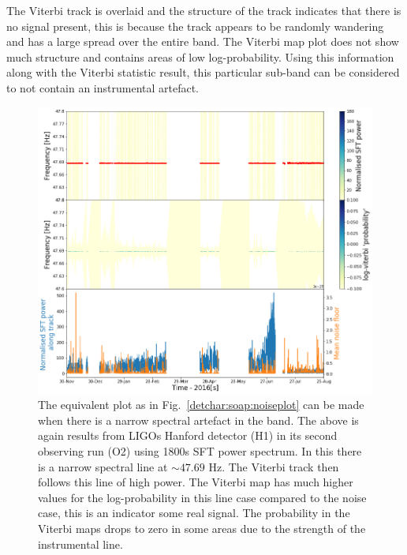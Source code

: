 The Viterbi track is overlaid and the structure of the track indicates that there is no signal present, this is because the track appears to be randomly wandering and has a large spread over the entire band. 
The Viterbi map plot does not show much structure and contains areas of low log-probability.
Using this information along with the Viterbi statistic result, this particular sub-band can be considered to not contain an instrumental artefact. 
%
\begin{figure}
	\centering
	\includegraphics[width=\textwidth]{C5_detchar/track_F47_6_47_8_linenarrow.png}
	\caption[Example SOAP output for string narrow instrumental line.]{The equivalent plot as in Fig.~\ref{detchar:soap:noiseplot} can be made when there is a narrow spectral artefact in the band. The above is again results from \glspl{LIGO} Hanford detector (H1) in its second observing run (O2) using 1800s \gls{SFT} power spectrum. In this there is a narrow spectral line at $\sim 47.69$ Hz. The Viterbi track then follows this line of high power. The Viterbi map has much higher values for the log-probability in this line case compared to the noise case, this is an indicator some real signal. The probability in the Viterbi maps drops to zero in some areas due to the strength of the instrumental line. }
	\label{detchar:soap:lineplot}
\end{figure}
%

